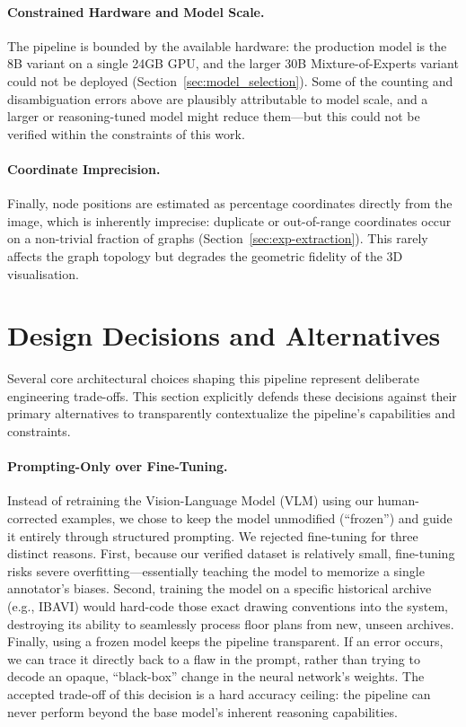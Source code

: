\documentclass[12pt,a4paper,openright]{report}
\begin{document}
\paragraph{Constrained Hardware and Model Scale.} The pipeline is bounded by the available hardware: the production model is the 8B variant on a single 24GB GPU, and the larger 30B Mixture-of-Experts variant could not be deployed (Section~\ref{sec:model_selection}). Some of the counting and disambiguation errors above are plausibly attributable to model scale, and a larger or reasoning-tuned model might reduce them---but this could not be verified within
the constraints of this work.

\paragraph{Coordinate Imprecision.} Finally, node positions are estimated as percentage coordinates directly from the image, which is inherently imprecise: duplicate or out-of-range coordinates occur on a non-trivial fraction of graphs (Section~\ref{sec:exp-extraction}). This rarely affects the graph topology but degrades the geometric fidelity of the 3D visualisation.


\section{Design Decisions and Alternatives}
\label{sec:design-decisions}

Several core architectural choices shaping this pipeline represent deliberate engineering trade-offs. This section explicitly defends these decisions against their primary alternatives to transparently contextualize the pipeline's capabilities and constraints.

\paragraph{Prompting-Only over Fine-Tuning.} Instead of retraining the Vision-Language Model (VLM) using our human-corrected examples, we chose to keep the model unmodified (``frozen'') and guide it entirely through structured prompting. We rejected fine-tuning for three distinct reasons. First, because our verified dataset is relatively small, fine-tuning risks severe overfitting---essentially teaching the model to memorize a single annotator's biases. Second, training the model on a specific historical archive (e.g., IBAVI) would hard-code those exact drawing conventions into the system, destroying its ability to seamlessly process floor plans from new, unseen archives. Finally, using a frozen model keeps the pipeline transparent. If an error occurs, we can trace it directly back to a flaw in the prompt, rather than trying to decode an opaque, ``black-box'' change in the neural network's weights. The accepted trade-off of this decision is a hard accuracy ceiling: the pipeline can never perform beyond the base model's inherent reasoning capabilities.
\end{document}
